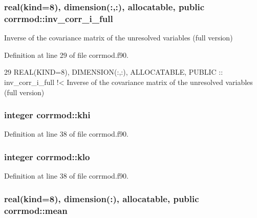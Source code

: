 \subsubsection[{\texorpdfstring{inv\+\_\+corr\+\_\+i\+\_\+full}{inv_corr_i_full}}]{\setlength{\rightskip}{0pt plus 5cm}real(kind=8), dimension(\+:,\+:), allocatable, public corrmod\+::inv\+\_\+corr\+\_\+i\+\_\+full}\hypertarget{namespacecorrmod_af2ab9712d246a94ae1a801a011aee3d8}{}\label{namespacecorrmod_af2ab9712d246a94ae1a801a011aee3d8}


Inverse of the covariance matrix of the unresolved variables (full version) 



Definition at line 29 of file corrmod.\+f90.


\begin{DoxyCode}
29   \textcolor{keywordtype}{REAL(KIND=8)}, \textcolor{keywordtype}{DIMENSION(:,:)}, \textcolor{keywordtype}{ALLOCATABLE}, \textcolor{keywordtype}{PUBLIC} :: inv\_corr\_i\_full\textcolor{comment}{ !< Inverse of the covariance matrix
       of the unresolved variables (full version)}
\end{DoxyCode}
\subsubsection[{\texorpdfstring{khi}{khi}}]{\setlength{\rightskip}{0pt plus 5cm}integer corrmod\+::khi\hspace{0.3cm}{\ttfamily [private]}}\hypertarget{namespacecorrmod_ac3bac71aa78c9e05401de3680f0c4ffc}{}\label{namespacecorrmod_ac3bac71aa78c9e05401de3680f0c4ffc}


Definition at line 38 of file corrmod.\+f90.

\subsubsection[{\texorpdfstring{klo}{klo}}]{\setlength{\rightskip}{0pt plus 5cm}integer corrmod\+::klo\hspace{0.3cm}{\ttfamily [private]}}\hypertarget{namespacecorrmod_a25e22cc2633ad68b74ebc21589957554}{}\label{namespacecorrmod_a25e22cc2633ad68b74ebc21589957554}


Definition at line 38 of file corrmod.\+f90.

\subsubsection[{\texorpdfstring{mean}{mean}}]{\setlength{\rightskip}{0pt plus 5cm}real(kind=8), dimension(\+:), allocatable, public corrmod\+::mean}\hypertarget{namespacecorrmod_a1f1f0cbe5283ace955c2d27c4b34f2c0}{}\label{namespacecorrmod_a1f1f0cbe5283ace955c2d27c4b34f2c0}


